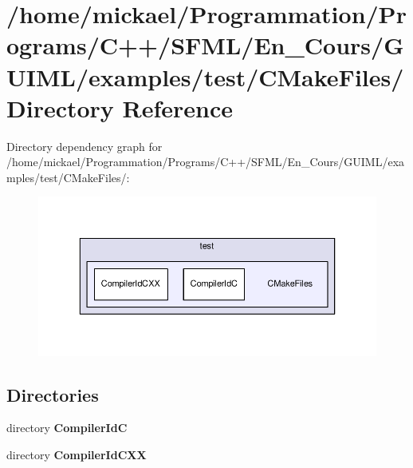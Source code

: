 \section{/home/mickael/\-Programmation/\-Programs/\-C++/\-S\-F\-M\-L/\-En\-\_\-\-Cours/\-G\-U\-I\-M\-L/examples/test/\-C\-Make\-Files/ Directory Reference}
\label{dir_89bcb631d08662da719f647d0b5f86df}
Directory dependency graph for /home/mickael/\-Programmation/\-Programs/\-C++/\-S\-F\-M\-L/\-En\-\_\-\-Cours/\-G\-U\-I\-M\-L/examples/test/\-C\-Make\-Files/\-:\nopagebreak
\begin{figure}[H]
\begin{center}
\leavevmode
\includegraphics[width=350pt]{dir_89bcb631d08662da719f647d0b5f86df_dep}
\end{center}
\end{figure}
\subsection*{Directories}
\begin{DoxyCompactItemize}
\item 
directory {\bf Compiler\-Id\-C}
\item 
directory {\bf Compiler\-Id\-C\-X\-X}
\end{DoxyCompactItemize}
